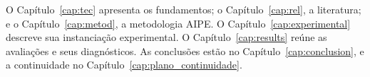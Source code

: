 O Capítulo~\ref{cap:tec} apresenta os fundamentos; o Capítulo~\ref{cap:rel}, a literatura; e o Capítulo~\ref{cap:metod}, a metodologia AIPE. O Capítulo~\ref{cap:experimental} descreve sua instanciação experimental. O Capítulo~\ref{cap:results} reúne as avaliações e seus diagnósticos. As conclusões estão no Capítulo~\ref{cap:conclusion}, e a continuidade no Capítulo~\ref{cap:plano_continuidade}.

\newpage\lhead{\rightmark}
